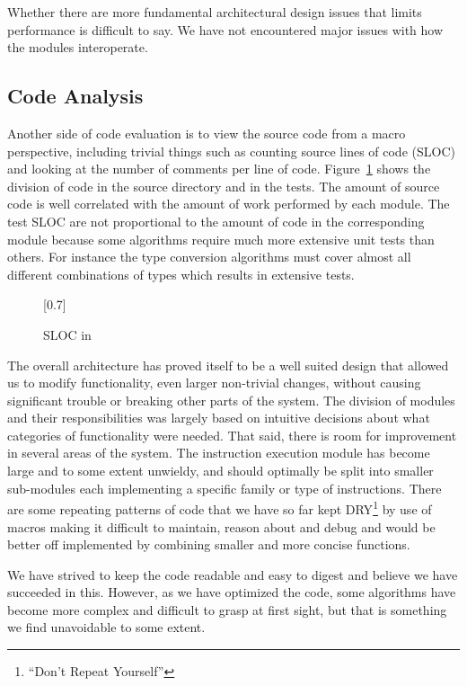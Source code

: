 Whether there are more fundamental architectural design issues that limits
performance is difficult to say. We have not encountered major issues with how
the modules interoperate.

\subsection{Code Analysis}

Another side of code evaluation is to view the source code from a macro
perspective, including trivial things such as counting source lines of code
(SLOC) and looking at the number of comments per line of
code. Figure~\ref{fig:eval:sloc} shows the division of code in the source
directory and in the tests. The amount of source code is well correlated with
the amount of work performed by each module. The test SLOC are not proportional
to the amount of code in the corresponding module because some algorithms
require much more extensive unit tests than others. For instance the type
conversion algorithms must cover almost all different combinations of types
which results in extensive tests.

\begin{figure}
  \centering
  \scalebox{0.8}[0.7]{}
  \caption{SLOC in \thename{}}
  \label{fig:eval:sloc}
\end{figure}

The overall architecture has proved itself to be a well suited design that
allowed us to modify functionality, even larger non-trivial changes, without
causing significant trouble or breaking other parts of the system. The division
of modules and their responsibilities was largely based on intuitive decisions
about what categories of functionality were needed. That said, there is room for
improvement in several areas of the system. The instruction execution module has
become large and to some extent unwieldy, and should optimally be split into
smaller sub-modules each implementing a specific family or type of
instructions. There are some repeating patterns of code that we have so far kept
DRY\footnote{``Don't Repeat Yourself''} by use of macros making it difficult to
maintain, reason about and debug and would be better off implemented by
combining smaller and more concise functions.

We have strived to keep the code readable and easy to digest and believe we have
succeeded in this. However, as we have optimized the code, some algorithms have
become more complex and difficult to grasp at first sight, but that is something
we find unavoidable to some extent.

